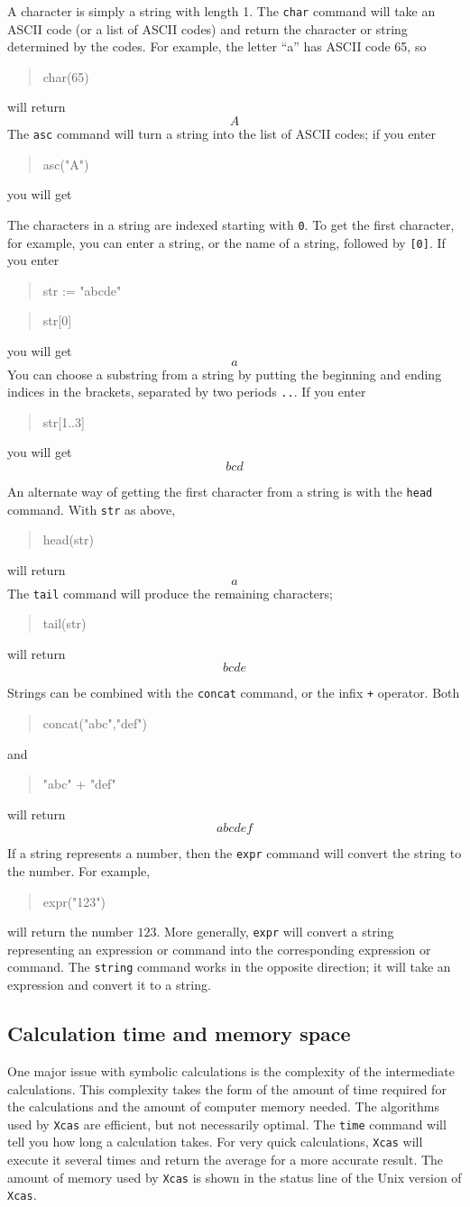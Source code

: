\documentclass{article}
\newcommand{\xcasin}[1]
{\begin{quote}\ttfamily
#1
\end{quote}}
\newcommand{\xcasout}[1]
{\begin{equation*}
#1
\end{equation*}}
\begin{document}
A character is simply a string with length 1.  The \texttt{char}
command will take an ASCII code (or a list of ASCII codes) and return
the character or string determined by the codes.  For example, the
letter ``a'' has ASCII code 65, so
\xcasin{char(65)}
will return
\xcasout{A}
The \texttt{asc} command will turn a string into the list of ASCII
codes; if you enter
\xcasin{asc("A")}
you will get
\xcasout{[65]}

The characters in a string are indexed starting with \texttt{0}.
To get the first character, for example, you can enter a string, or
the name of a string, followed by \texttt{[0]}.  If you enter
\xcasin{str := "abcde"}
\xcasin{str[0]}
you will get
\xcasout{a}
You can choose a substring from a string by putting the beginning and
ending indices in the brackets, separated by two periods \texttt{..}.
If you enter
\xcasin{str[1..3]}
you will get
\xcasout{bcd}

An alternate way of getting the first character from a string is with
the \texttt{head} command.  With \texttt{str} as above, 
\xcasin{head(str)}
will return
\xcasout{a}
The \texttt{tail} command will produce the remaining characters;
\xcasin{tail(str)}
will return
\xcasout{bcde}

Strings can be combined with the \texttt{concat} command, or the infix
\texttt{+} operator.  Both 
\xcasin{concat("abc","def")}
and
\xcasin{"abc" + "def"}
will return
\xcasout{abcdef}

If a string represents a number, then the \texttt{expr} command will
convert the string to the number.  For example,
\xcasin{expr("123")}
will return the number $123$.  More generally, \texttt{expr} will
convert a string representing an expression or command into the
corresponding expression or command.  The \texttt{string} command
works in the opposite direction; it will take an expression and
convert it to a string.

\subsection{Calculation time and memory space}

One major issue with symbolic calculations is the complexity of the
intermediate calculations.  This complexity takes the form of the
amount of time required for the calculations and the amount of
computer memory needed.  The algorithms used by \texttt{Xcas} are
efficient, but not necessarily optimal.  The \texttt{time} command
will tell you how long a calculation takes.  For very quick
calculations, \texttt{Xcas} will execute it several times and return
the average for a more accurate result.  The amount of memory used by
\texttt{Xcas} is shown in the status line of the Unix version of
\texttt{Xcas}.  
\end{document}

